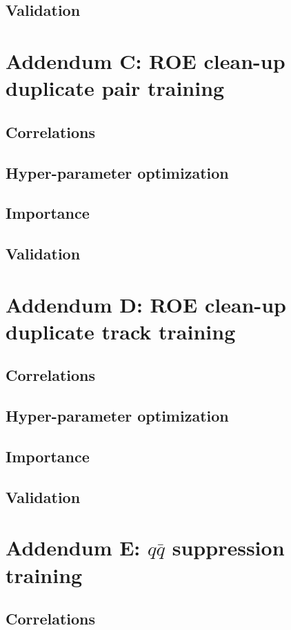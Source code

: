 \documentclass[headings=standardclasses,headings=big,oneside,a4paper,openany,12pt]{scrbook}
\begin{document}
\section*{Validation}

\chapter*{Addendum C: ROE clean-up duplicate pair training}
\section*{Correlations}
\section*{Hyper-parameter optimization}
\section*{Importance}
\section*{Validation}

\chapter*{Addendum D: ROE clean-up duplicate track training}
\section*{Correlations}
\section*{Hyper-parameter optimization}
\section*{Importance}
\section*{Validation}

\chapter*{Addendum E: $q \bar q$ suppression training}
\section*{Correlations}
\end{document}
